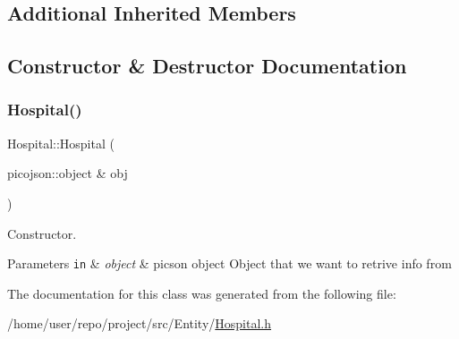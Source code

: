 \subsection*{Additional Inherited Members}


\subsection{Constructor \& Destructor Documentation}
\mbox{\label{classHospital_aebc8b47c3d12ea7fc500981d89341e82}} 
\subsubsection{\texorpdfstring{Hospital()}{Hospital()}}
{\footnotesize\ttfamily Hospital\+::\+Hospital (\begin{DoxyParamCaption}\item[{picojson\+::object \&}]{obj }\end{DoxyParamCaption})\hspace{0.3cm}{\ttfamily [inline]}}



Constructor. 


\begin{DoxyParams}[1]{Parameters}
\mbox{\tt in}  & {\em object} & picson object Object that we want to retrive info from \\
\hline
\end{DoxyParams}


The documentation for this class was generated from the following file\+:\begin{DoxyCompactItemize}
\item 
/home/user/repo/project/src/\+Entity/\hyperlink{Hospital_8h}{Hospital.\+h}\end{DoxyCompactItemize}
